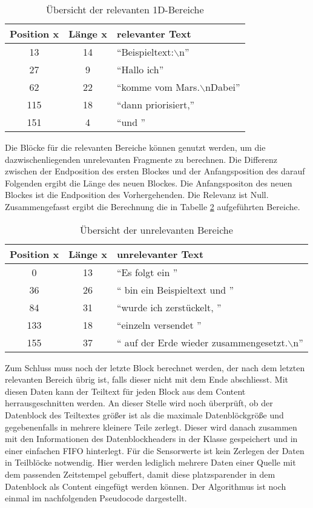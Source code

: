 \begin{longtable}{|ccl|}
\caption{Übersicht der relevanten 1D-Bereiche} \\
\hline
\label{tab:UebersichtDerEindimensionalenBereiche}
\textbf{Position x} & \textbf{Länge x} &
\textbf{relevanter Text}\\
\hline
   13 & 14 & "`Beispieltext:\ensuremath{\backslash}n"' \\
   27 &  9 & "`Hallo ich"' \\
   62 & 22 & "`komme vom Mars.\ensuremath{\backslash}nDabei"' \\
  115 & 18 & "`dann priorisiert,"' \\
  151 &  4 & "`und "' \\
\hline
\end{longtable}

Die Blöcke für die relevanten Bereiche können genutzt werden,
um die dazwischenliegenden unrelevanten Fragmente zu berechnen. Die Differenz
zwischen der Endposition des ersten Blockes und der Anfangsposition des
darauf Folgenden ergibt die Länge des neuen Blockes. Die Anfangspositon des
neuen Blockes ist die Endposition des Vorhergehenden. Die Relevanz ist Null.
Zusammengefasst ergibt die Berechnung die in Tabelle
\ref{tab:UebersichtDerUNRelevantenBereiche} aufgeführten Bereiche.

\begin{longtable}{|ccl|}
\caption{Übersicht der unrelevanten Bereiche} \\
\hline
\label{tab:UebersichtDerUNRelevantenBereiche}
\textbf{Position x} & \textbf{Länge x} &
\textbf{unrelevanter Text}\\
\hline
   0 & 13 & "`Es folgt ein "' \\
  36 & 26 & "` bin ein Beispieltext und "' \\
  84 & 31 & "`wurde ich zerstückelt, "' \\
 133 & 18 & "`einzeln versendet "' \\
 155 & 37 & "` auf der Erde wieder zusammengesetzt.\ensuremath{\backslash}n"' \\
\hline
\end{longtable}

Zum Schluss muss noch der letzte Block berechnet werden, der nach dem letzten
relevanten Bereich übrig ist, falls dieser nicht mit dem Ende abschliesst. Mit
diesen Daten kann der Teiltext für jeden Block aus dem Content
herrausgeschnitten werden. An dieser Stelle wird noch überprüft, ob der
Datenblock des Teiltextes größer ist als die maximale Datenblöckgröße und
gegebenenfalls in mehrere kleinere Teile zerlegt. Dieser wird danach zusammen
mit den Informationen des Datenblockheaders in der Klasse 
gespeichert und in einer einfachen FIFO hinterlegt. Für die Sensorwerte
ist kein Zerlegen der Daten in Teilblöcke notwendig.
Hier werden lediglich mehrere Daten einer Quelle mit dem passenden
Zeitstempel gebuffert, damit diese platzsparender in dem Datenblock als
Content eingefügt werden können. \newline
Der Algorithmus ist noch einmal im nachfolgenden Pseudocode dargestellt.

